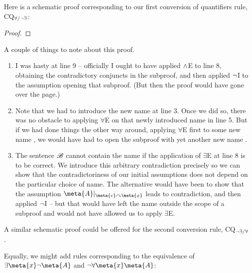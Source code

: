  Here is a schematic proof corresponding to our first conversion of quantifiers rule, CQ$_{\forall/\neg\exists}$:
\begin{proof}
	\open
		\open
			\open
		\close
		\close
		\close
\end{proof}
A couple of things to note about this proof. \begin{enumerate}
\item I was hasty at line 9 – officially I ought to have applied $\wedge$E to line 8, obtaining the contradictory conjuncts in the subproof, and then applied $\neg$I to the assumption opening that subproof. (But then the proof would have gone over the page.)
\item Note that we had to introduce the new name  at line 3. Once we did so, there was no obstacle to applying $\forall$E on that newly introduced name in line 5. But if we had done things the other way around, applying $\forall$E first to some new name , we would have had to open the subproof with yet another new name . 
	\item The sentence $\mathscr{B}$ cannot contain the name  if the application of $\exists$E at line 8 is to be correct. We introduce this arbitrary contradiction precisely so we can show that the contradictoriness of our initial assumptions does not depend on the particular choice of name. The alternative would have been to show that the assumption $\meta{A}\subs{\meta{c}}{\meta{x}}$ leads to contradiction, and then applied $\neg$I – but that would have left the name  outside the scope of a subproof and would not have allowed us to apply $\exists$E.
\end{enumerate}

A similar schematic proof could be offered for the second conversion rule, CQ$_{\neg\exists/\forall}$.

Equally, we might add rules corresponding to the equivalence of $\exists\meta{x}\enot\meta{A}$ and $\enot\forall\meta{x}\meta{A}$:

